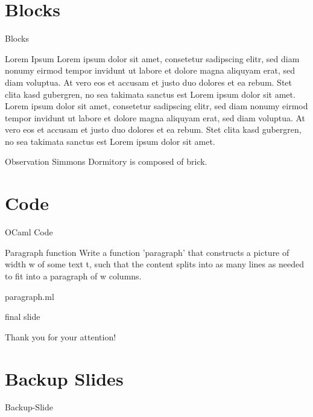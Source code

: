\documentclass{beamer}
\begin{document}
\section{Blocks}
\begin{frame}{Blocks}
\begin{block}{Lorem Ipsum}
Lorem ipsum dolor sit amet, consetetur sadipscing elitr, sed diam nonumy eirmod tempor invidunt ut labore et dolore magna aliquyam erat, sed diam voluptua. 
At vero eos et accusam et justo duo dolores et ea rebum. Stet clita kasd gubergren, no sea takimata sanctus est Lorem ipsum dolor sit amet. 
Lorem ipsum dolor sit amet, consetetur sadipscing elitr, sed diam nonumy eirmod tempor invidunt ut labore et dolore magna aliquyam erat, sed diam voluptua. 
At vero eos et accusam et justo duo dolores et ea rebum. Stet clita kasd gubergren, no sea takimata sanctus est Lorem ipsum dolor sit amet.
\end{block}
\begin{block}{Observation}
Simmons Dormitory is composed of brick.
\end{block} 
\end{frame}


\section{Code}
\begin{frame}{OCaml Code}
\begin{center}
\begin{block}{Paragraph function}
 Write a function 'paragraph' that constructs a picture of width w of some text t, such that the content splits into as many lines as needed to fit into a paragraph of w columns. 
\end{block}
\begin{block}{paragraph.ml}
{\small    }
\end{block}
\end{center}
\end{frame}


\begin{frame}
 \begin{beamercolorbox}[wd=\paperwidth, ht=1.4cm,rounded=true,shadow=true]{final slide}
      \begin{center}
	{\huge Thank you for your attention!}
      \end{center}
 \end{beamercolorbox}
\end{frame}

\section*{Backup Slides}
\begin{frame}[noframenumbering]{Backup-Slide}
\end{frame}
\end{document}
